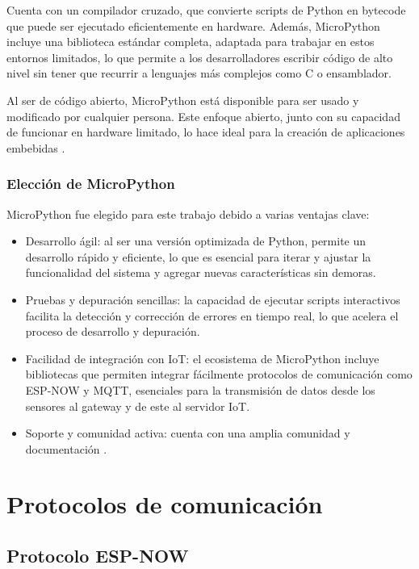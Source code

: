 Cuenta con un compilador cruzado, que convierte scripts de Python en bytecode que puede ser ejecutado eficientemente en hardware. Además, MicroPython incluye una biblioteca estándar completa, adaptada para trabajar en estos entornos limitados, lo que permite a los desarrolladores escribir código de alto nivel sin tener que recurrir a lenguajes más complejos como C o ensamblador.

Al ser de código abierto, MicroPython está disponible para ser usado y modificado por cualquier persona. Este enfoque abierto, junto con su capacidad de funcionar en hardware limitado, lo hace ideal para la creación de aplicaciones embebidas \citep{micropython} \citep{infoMpy}. 

\subsubsection{Elección de MicroPython}
MicroPython fue elegido para este trabajo debido a varias ventajas clave:

\begin{itemize}
    \item Desarrollo ágil: al ser una versión optimizada de Python, permite un desarrollo rápido y eficiente, lo que es esencial para iterar y ajustar la funcionalidad del sistema y agregar nuevas características sin demoras.
    \item Pruebas y depuración sencillas: la capacidad de ejecutar scripts interactivos facilita la detección y corrección de errores en tiempo real, lo que acelera el proceso de desarrollo y depuración.
    \item Facilidad de integración con IoT: el ecosistema de MicroPython incluye bibliotecas que permiten integrar fácilmente protocolos de comunicación como ESP-NOW y MQTT, esenciales para la transmisión de datos  desde los sensores al gateway y de este al servidor IoT.
    \item Soporte y comunidad activa: cuenta con una amplia comunidad y documentación \citep{docsmpy}.
\end{itemize}

\section{Protocolos de comunicación}

\subsection{Protocolo ESP-NOW}

